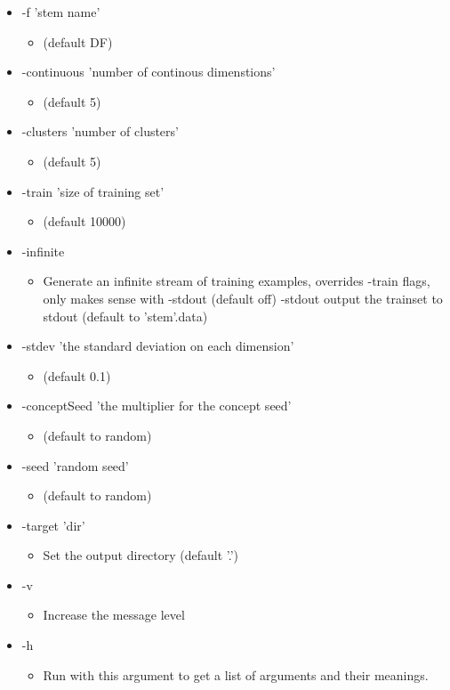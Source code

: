 \begin{itemize}
\item -f 'stem name'\begin{itemize}
\item (default DF)\end{itemize}
\item -continuous 'number of continous dimenstions'\begin{itemize}
\item (default 5)\end{itemize}
\item -clusters 'number of clusters'\begin{itemize}
\item (default 5)\end{itemize}
\item -train 'size of training set'\begin{itemize}
\item (default 10000)\end{itemize}
\item -infinite\begin{itemize}
\item Generate an infinite stream of training examples, overrides -train flags, only makes sense with -stdout (default off) -stdout output the trainset to stdout (default to 'stem'.data)\end{itemize}
\item -stdev 'the standard deviation on each dimension'\begin{itemize}
\item (default 0.1)\end{itemize}
\item -concept\-Seed 'the multiplier for the concept seed'\begin{itemize}
\item (default to random)\end{itemize}
\item -seed 'random seed'\begin{itemize}
\item (default to random)\end{itemize}
\item -target 'dir'\begin{itemize}
\item Set the output directory (default '.')\end{itemize}
\item -v\begin{itemize}
\item Increase the message level\end{itemize}
\item -h\begin{itemize}
\item Run with this argument to get a list of arguments and their meanings.\end{itemize}
\end{itemize}


